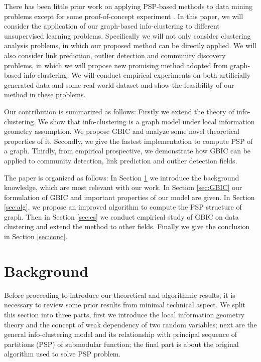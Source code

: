 There has been little prior work on applying PSP-based methods to data mining problems except for some proof-of-concept experiment \citep{mac}. In this paper, we will consider the application
of our graph-based info-clustering to different unsupervised learning problems. Specifically
we will not only consider clustering analysis problems, in which our proposed method can be directly applied. We will also consider link prediction, outlier detection and community discovery problems, in which we will propose new promising
method adopted from graph-based info-clustering. We will conduct empirical experiments on both artificially generated data and some real-world dataset and show the feasibility of our method in
these problems.

Our contribution is summarized as follows: Firstly we extend the theory of info-clustering. We show that info-clustering is a graph model under local information geometry assumption. We propose GBIC and analyze some novel theoretical properties of it. Secondly, we give the fastest implementation to compute PSP of a graph. Thirdly, from empirical prospective, we demonstrate how GBIC can be applied to community detection, link prediction and outlier detection fields.
 
The paper is organized as follows: In Section \ref{sec:bk} we introduce the background knowledge, which are most relevant with our work. In Section \ref{sec:GBIC} our formulation of GBIC and important properties of our model are given. In Section \ref{sec:alg}, we propose an improved algorithm to compute the PSP structure of graph. Then in Section \ref{sec:es} we conduct empirical study of GBIC on data clustering and extend the method to other fields. Finally we give the conclusion in Section \ref{sec:conc}.


\section{Background}\label{sec:bk}
Before proceeding to introduce our theoretical and algorithmic results, it is necessary to review some prior results from minimal technical aspect. We split this section into three parts, first we introduce
the local information geometry theory and the concept of weak dependency of two random variables;
next are the general info-clustering model and its relationship with principal sequence of partitions (PSP) of submodular function;
the final part is about the original algorithm used to solve PSP problem.
